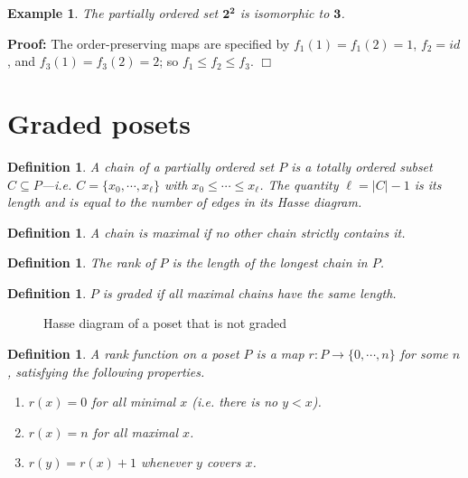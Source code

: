 \documentclass[11pt]{article}
\newtheorem{definition}[theorem]{Definition}
\newtheorem{example}[theorem]{Example}
\newenvironment{proof}{\noindent \textbf{Proof:}}{$\Box$}
\newcommand{\keyword}[1]{{\emph{#1}}}
\newcommand{\intposet}[1]{{\mathbf{#1}}}
\begin{document}
\begin{enumerate}
\begin{example}
    The partially ordered set $\intposet{2}^\intposet{2}$ is isomorphic to $\intposet{3}$.
\end{example}
\begin{proof}
    The order-preserving
    maps are specified by $f_1(1) = f_1(2) = 1$, $f_2 = id$, and
    $f_3(1) = f_3(2) = 2$; so $f_1 \leq f_2 \leq f_3$.
\end{proof}
\end{enumerate}

\section{Graded posets}

\begin{definition}
    A \keyword{chain} of a partially ordered set $P$ is a totally ordered subset
    $C \subseteq P$---i.e. $C = \{ x_0, \cdots, x_\ell \}$ with
    $x_0 \leq \cdots \leq x_\ell$. The quantity $\ell = |C| - 1$ is its
    \keyword{length} and is equal to the number of edges in its Hasse diagram.
\end{definition}
\begin{definition}
    A chain is \keyword{maximal} if no other chain strictly contains it.
\end{definition}
\begin{definition}
    The \keyword{rank} of $P$ is the length of the longest chain in $P$.
\end{definition}
\begin{definition}
    $P$ is \keyword{graded} if all maximal chains have the same length.
\end{definition}
\begin{figure}[ht]
    \caption{Hasse diagram of a poset that is not graded}
    \begin{center}
    \end{center}
\end{figure}
\begin{definition}
    A \keyword{rank function} on a poset $P$ is a map $r: P \to \{0,\cdots,n\}$
    for some $n$, satisfying the following properties.
    \begin{enumerate}
        \item $r(x) = 0$ for all minimal $x$ (i.e. there is no $y < x$).
        \item $r(x) = n$ for all maximal $x$.
        \item $r(y) = r(x) + 1$ whenever $y$ covers $x$.
    \end{enumerate}
\end{definition}
\end{document}
